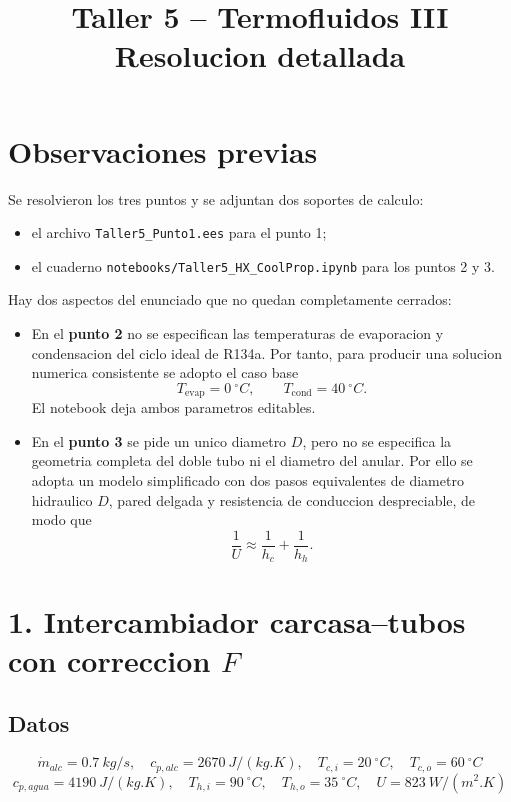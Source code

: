 \documentclass[11pt]{article}
\title{Taller 5 -- Termofluidos III\\Resolucion detallada}
\author{}
\date{}
\begin{document}
\maketitle

\section*{Observaciones previas}

Se resolvieron los tres puntos y se adjuntan dos soportes de calculo:

\begin{itemize}
  \item el archivo \texttt{Taller5\_Punto1.ees} para el punto 1;
  \item el cuaderno \texttt{notebooks/Taller5\_HX\_CoolProp.ipynb} para los puntos 2 y 3.
\end{itemize}

Hay dos aspectos del enunciado que no quedan completamente cerrados:

\begin{itemize}
  \item En el \textbf{punto 2} no se especifican las temperaturas de evaporacion y condensacion del ciclo ideal de R134a. Por tanto, para producir una solucion numerica consistente se adopto el caso base
  \[
  T_{\mathrm{evap}}=\SI{0}{^\circ C}, \qquad T_{\mathrm{cond}}=\SI{40}{^\circ C}.
  \]
  El notebook deja ambos parametros editables.
  \item En el \textbf{punto 3} se pide un unico diametro \(D\), pero no se especifica la geometria completa del doble tubo ni el diametro del anular. Por ello se adopta un modelo simplificado con dos pasos equivalentes de diametro hidraulico \(D\), pared delgada y resistencia de conduccion despreciable, de modo que
  \[
  \frac{1}{U}\approx \frac{1}{h_c}+\frac{1}{h_h}.
  \]
\end{itemize}

\section*{1. Intercambiador carcasa--tubos con correccion \(F\)}

\subsection*{Datos}

\[
\dot m_{alc}=\SI{0.7}{kg/s}, \quad c_{p,alc}=\SI{2670}{J/(kg.K)}, \quad T_{c,i}=\SI{20}{^\circ C}, \quad T_{c,o}=\SI{60}{^\circ C}
\]
\[
c_{p,agua}=\SI{4190}{J/(kg.K)}, \quad T_{h,i}=\SI{90}{^\circ C}, \quad T_{h,o}=\SI{35}{^\circ C}, \quad U=\SI{823}{W/(m^2.K)}
\]
\end{document}
